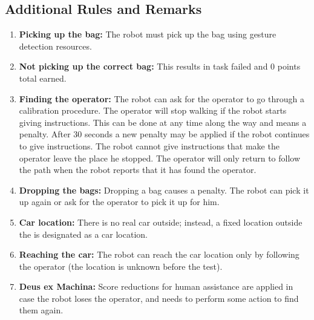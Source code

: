 \subsection*{Additional Rules and Remarks}
\begin{enumerate}[nosep]

	\item \textbf{Picking up the bag:} The robot must pick up the bag using gesture detection resources.
    \item \textbf{Not picking up the correct bag:} This results in task failed and 0 points total earned.
    \item \textbf{Finding the operator:} The robot can ask for the operator to go through a calibration procedure. The operator will stop walking if the robot starts giving instructions. This can be done at any time along the way and means a penalty. After 30 seconds a new penalty may be applied if the robot continues to give instructions. The robot cannot give instructions that make the operator leave the place he stopped. The operator will only return to follow the path when the robot reports that it has found the operator.
    \item \textbf{Dropping the bags:} Dropping a bag causes a penalty. The robot can pick it up again or ask for the operator to pick it up for him.
	\item \textbf{Car location:} There is no real car outside; instead, a fixed location outside the \Arena{} is designated as a car location.
	\item \textbf{Reaching the car:} The robot can reach the car location only by following the operator (the location is unknown before the test).
	\item \textbf{Deus ex Machina:} Score reductions for human assistance are applied in case the robot loses the operator, and needs to perform some action to find them again. %

\end{enumerate}

